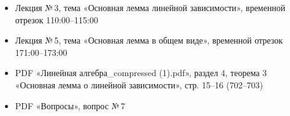 \begin{tcolorbox}[title=Источники, colback=gray!10]
\begin{itemize}
  \item Лекция №\,3, тема «Основная лемма линейной зависимости», временной отрезок 110:00--115:00
  \item Лекция №\,5, тема «Основная лемма в общем виде», временной отрезок 171:00--173:00
  \item PDF «Линейная алгебра\_compressed (1).pdf», раздел 4, теорема 3 «Основная лемма о линейной зависимости», стр. 15--16 (702--703)
  \item PDF «Вопросы», вопрос №\,7
\end{itemize}
\end{tcolorbox}
